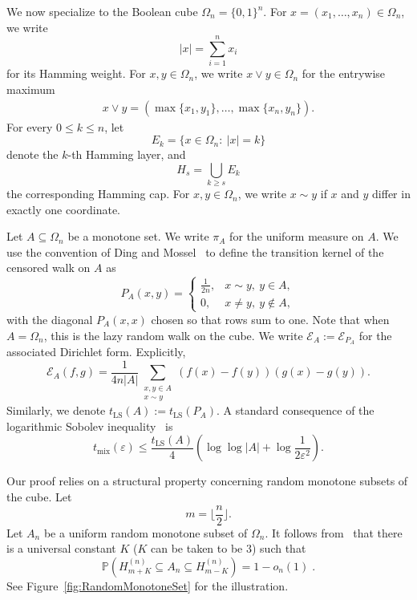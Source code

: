 \documentclass[12pt,final]{amsart}
\newcommand{\1}{\mathbf{1}}
\newcommand{\tmix}{t_{\operatorname{mix}}(\varepsilon)}
\newcommand{\Ecal}{\mathcal{E}}
\begin{document}
We now specialize to the Boolean cube $\Omega_n=\{0,1\}^n$. 
For $x=(x_1,\ldots,x_n)\in\Omega_n$, we write
$$
|x|=\sum_{i=1}^n x_i
$$
for its Hamming weight. For $x,y\in \Omega_n$, we write $x\vee y\in \Omega_n$ for the entrywise maximum 
\begin{align*}
    x\vee y=(\max\{x_1,y_1\},\ldots, \max\{x_n,y_n\}).
\end{align*}
For every $0\le k\le n$, let
$$
E_k=\{x\in\Omega_n:\ |x|=k\}
$$
denote the $k$-th Hamming layer, and
$$
H_s=\bigcup_{k\ge s}E_k
$$
the corresponding Hamming cap.  
For $x,y\in\Omega_n$, we write $x\sim y$ if $x$ and $y$ differ in exactly one coordinate. 

Let $A\subseteq\Omega_n$ be a monotone set. We write $\pi_A$ for the uniform measure on $A$. We use the convention of Ding and Mossel~\cite{ding2014mixing} to define the transition kernel of the censored walk on $A$ as
$$
P_A(x,y)=
\begin{cases}
\frac{1}{2n},& x\sim y,\ y\in A,\\
0,& x\neq y,\ y\notin A,
\end{cases}
$$
with the diagonal $P_A(x, x)$ chosen so that rows sum to one. Note that when $A=\Omega_n$, this is the lazy random walk on the cube.  
We write
$
\Ecal_A:=\Ecal_{P_A}
$
for the associated Dirichlet form. Explicitly,
$$
\Ecal_A(f,g)
=
\frac{1}{4n|A|}
\sum_{\substack{x,y\in A\\ x\sim y}}
(f(x)-f(y))(g(x)-g(y)).
$$
Similarly, we denote $
t_{\operatorname{LS}}(A):=
t_{\operatorname{LS}}(P_A).
$
A standard consequence of the logarithmic Sobolev inequality~\cite[Corollary 3.2]{salez2025modern} is
\begin{equation}\label{eq:LSI-mixing}
    \tmix \leq \frac{ t_{\operatorname{LS}}(A)}{4}\left(\log\log|A| + \log \frac{1}{2\varepsilon^2}\right). 
\end{equation}


Our proof relies on a structural property concerning random monotone subsets of the cube. Let
\[
m=\Big\lfloor \frac n2\Big\rfloor.
\]
Let $A_n$ be a uniform random monotone subset of $\Omega_n$. It follows from~\cite[Section 1.2]{Korshunov03} that there is a universal constant $K$ ($K$ can be taken to be $3$) such that 
\begin{equation}
\label{eqn:TypicalA}
    \mathbb{P}(H_{m+K}^{(n)}\subseteq A_n\subseteq H_{m-K}^{(n)})=1-o_n(1)\;.
\end{equation}
See Figure~\ref{fig:RandomMonotoneSet} for the illustration. 
\end{document}
